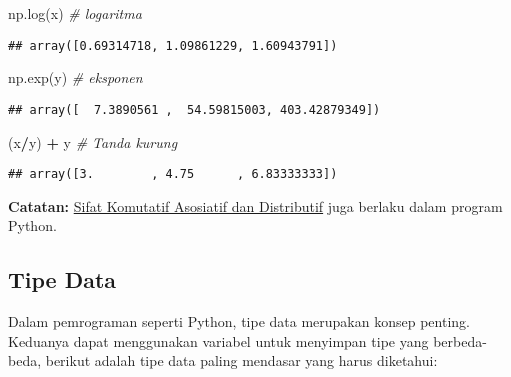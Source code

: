 \documentclass[
]{docs}
\newenvironment{Shaded}{\begin{snugshade}}{\end{snugshade}}
\newcommand{\CommentTok}[1]{\textcolor[rgb]{0.56,0.35,0.01}{\textit{#1}}}
\newcommand{\NormalTok}[1]{#1}
\newcommand{\OperatorTok}[1]{\textcolor[rgb]{0.81,0.36,0.00}{\textbf{#1}}}
\begin{document}
\begin{Shaded}
\begin{Highlighting}[]
\NormalTok{np.log(x)               }\CommentTok{\# logaritma }
\end{Highlighting}
\end{Shaded}

\begin{verbatim}
## array([0.69314718, 1.09861229, 1.60943791])
\end{verbatim}

\begin{Shaded}
\begin{Highlighting}[]
\NormalTok{np.exp(y)               }\CommentTok{\# eksponen}
\end{Highlighting}
\end{Shaded}

\begin{verbatim}
## array([  7.3890561 ,  54.59815003, 403.42879349])
\end{verbatim}

\begin{Shaded}
\begin{Highlighting}[]
\NormalTok{(x}\OperatorTok{/}\NormalTok{y) }\OperatorTok{+}\NormalTok{ y               }\CommentTok{\# Tanda kurung}
\end{Highlighting}
\end{Shaded}

\begin{verbatim}
## array([3.        , 4.75      , 6.83333333])
\end{verbatim}

\textbf{Catatan:} \href{https://www.advernesia.com/blog/matematika/sifat-komutatif-asosiatif-dan-distributif/}{Sifat Komutatif Asosiatif dan Distributif} juga berlaku dalam program Python.

\hypertarget{tipe-data}{%
\subsection{Tipe Data}\label{tipe-data}}

Dalam pemrograman seperti Python, tipe data merupakan konsep penting. Keduanya dapat menggunakan variabel untuk menyimpan tipe yang berbeda-beda, berikut adalah tipe data paling mendasar yang harus diketahui:
\end{document}
